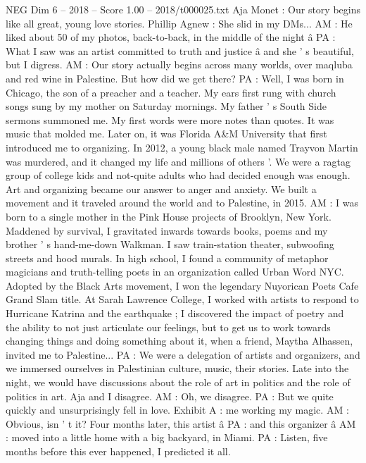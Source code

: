 \begin{textsample}{NEG Dim 6 – 2018 – Score 1.00 – 2018/t000025.txt}  \label{ex:f6_neg_017}
Aja Monet : Our story begins like all great, young love stories.
Phillip Agnew : She slid in my DMs...
AM : He liked about 50 of my photos, back-to-back, in the middle of the night â PA : What I saw was an artist committed to truth and justice â and she ' s beautiful, but I digress.
AM : Our story actually begins across many worlds, over maqluba and red wine in Palestine.
But how did we get there?
PA : Well, I was born in Chicago, the son of a preacher and a teacher.
My ears first rung with church songs sung by my mother on Saturday mornings.
My father ' s South Side sermons summoned me.
My first words were more notes than quotes.
It was music that molded me.
Later on, it was Florida A\&M University that first introduced me to organizing.
In 2012, a young black male named Trayvon Martin was murdered, and it changed my life and millions of others '.
We were a ragtag group of college kids and not-quite adults who had decided enough was enough.
Art and organizing became our answer to anger and anxiety.
We built a movement and it traveled around the world and to Palestine, in 2015.
AM : I was born to a single mother in the Pink House projects of Brooklyn, New York.
Maddened by survival, I gravitated inwards towards books, poems and my brother ' s hand-me-down Walkman.
I saw train-station theater, subwoofing streets and hood murals.
In high school, I found a community of metaphor magicians and truth-telling poets in an organization called Urban Word NYC.
Adopted by the Black Arts movement, I won the legendary Nuyorican Poets Cafe Grand Slam title.
At Sarah Lawrence College, I worked with artists to respond to Hurricane Katrina and the earthquake ; I discovered the impact of poetry and the ability to not just articulate our feelings, but to get us to work towards changing things and doing something about it, when a friend, Maytha Alhassen, invited me to Palestine...
PA : We were a delegation of artists and organizers, and we immersed ourselves in Palestinian culture, music, their stories.
Late into the night, we would have discussions about the role of art in politics and the role of politics in art.
Aja and I disagree.
AM : Oh, we disagree.
PA : But we quite quickly and unsurprisingly fell in love.
Exhibit A : me working my magic.
AM : Obvious, isn ' t it?
Four months later, this artist â PA : and this organizer â AM : moved into a little home with a big backyard, in Miami.
PA : Listen, five months before this ever happened, I predicted it all.

\end{textsample}
